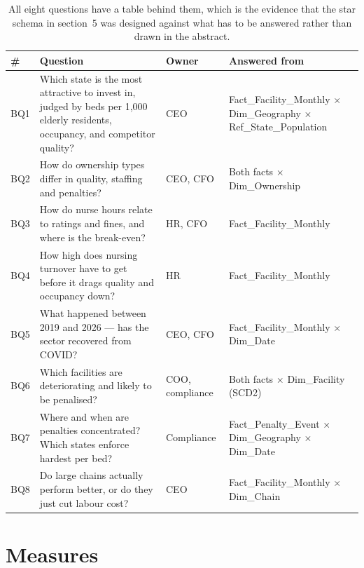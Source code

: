\documentclass[11pt,a4paper]{article}
\newcommand{\sansall}{\sffamily}
\begin{document}
\begin{table}[htbp]\centering
\begin{adjustbox}{max width=\linewidth}
\small
\begin{tabular}{L{0.8cm} L{7.9cm} L{2.2cm} L{5.4cm}}
\toprule
\sansall\bfseries \# & \sansall\bfseries Question &
\sansall\bfseries Owner & \sansall\bfseries Answered from \\
\midrule
BQ1 & Which state is the most attractive to invest in, judged by beds per
      1{,}000 elderly residents, occupancy, and competitor quality? & CEO &
      Fact\_Facility\_Monthly $\times$ Dim\_Geography $\times$ Ref\_State\_Population \\
\addlinespace
BQ2 & How do ownership types differ in quality, staffing and penalties? &
      CEO, CFO & Both facts $\times$ Dim\_Ownership \\
\addlinespace
BQ3 & How do nurse hours relate to ratings and fines, and where is the
      break-even? & HR, CFO & Fact\_Facility\_Monthly \\
\addlinespace
BQ4 & How high does nursing turnover have to get before it drags quality and
      occupancy down? & HR & Fact\_Facility\_Monthly \\
\addlinespace
BQ5 & What happened between 2019 and 2026 — has the sector recovered from
      COVID? & CEO, CFO & Fact\_Facility\_Monthly $\times$ Dim\_Date \\
\addlinespace
BQ6 & Which facilities are deteriorating and likely to be penalised? &
      COO, compliance & Both facts $\times$ Dim\_Facility (SCD2) \\
\addlinespace
BQ7 & Where and when are penalties concentrated? Which states enforce hardest
      per bed? & Compliance &
      Fact\_Penalty\_Event $\times$ Dim\_Geography $\times$ Dim\_Date \\
\addlinespace
BQ8 & Do large chains actually perform better, or do they just cut labour
      cost? & CEO & Fact\_Facility\_Monthly $\times$ Dim\_Chain \\
\bottomrule
\end{tabular}
\end{adjustbox}
\caption{All eight questions have a table behind them, which is the evidence
that the star schema in section~5 was designed against what has to be answered
rather than drawn in the abstract.}
\label{tab:bq}
\end{table}

\section{Measures}
\end{document}

